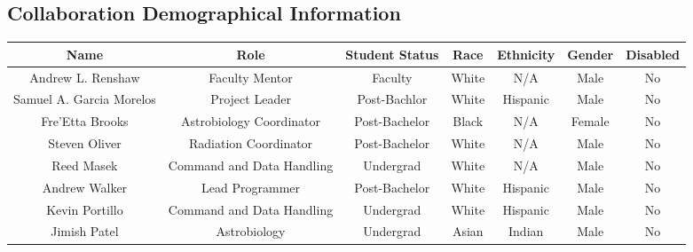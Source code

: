 \begin{appendices}
  \section{Collaboration Demographical Information}
\begin{table}[h!]
\centering  
  \begin{tabular}  {ccccccc}
      \textbf{Name} &  \textbf{Role} & \textbf{Student Status} & \textbf{Race} & \textbf{Ethnicity} & \textbf{Gender} & \textbf{Disabled}\\
 	\hline
	\hline
 	Andrew L. Renshaw & Faculty Mentor & Faculty & White & N/A & Male & No\\
 	\hline
 	Samuel A. Garcia Morelos & Project Leader & Post-Bachlor & White & Hispanic & Male & No\\
 	\hline
 	Fre'Etta Brooks & Astrobiology Coordinator & Post-Bachelor & Black & N/A & Female & No\\\hline
 	Steven Oliver & Radiation Coordinator & Post-Bachelor & White & N/A & Male & No\\\hline
 	Reed Masek & Command and Data Handling & Undergrad & White & N/A & Male & No\\\hline
 	Andrew Walker & Lead Programmer & Post-Bachelor & White & Hispanic & Male & No\\\hline
 	Kevin Portillo & Command and Data Handling & Undergrad & White & Hispanic & Male & No \\\hline
	Jimish Patel & Astrobiology & Undergrad & Asian & Indian & Male & No \\ \hline
	\end{tabular}	
	\end{table}  

\end{appendices}
